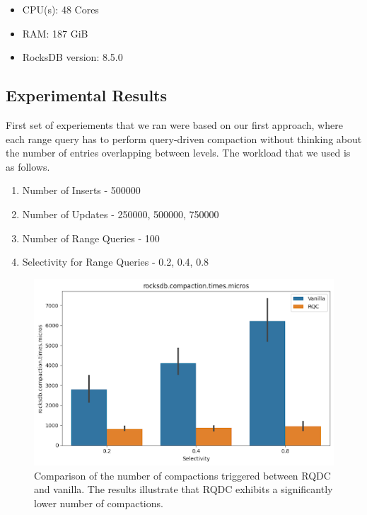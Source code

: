 \begin{itemize}
    \item CPU(s)\:: 48 Cores
    \item RAM\:: 187 GiB
    \item RocksDB version\:: 8.5.0
\end{itemize}

\subsection{Experimental Results}
First set of experiements that we ran were based on our first approach, where each range query has to 
perform query-driven compaction without thinking about the number of entries overlapping between levels. The workload that
we used is as follows.

\begin{enumerate}[leftmargin=*,labelindent=0mm, itemsep=0.2\baselineskip]
    \item Number of Inserts \-- 500000
    \item Number of Updates \-- 250000, 500000, 750000
    \item Number of Range Queries \-- 100 
    \item Selectivity for Range Queries \-- 0.2, 0.4, 0.8
\end{enumerate}

\begin{figure}
    \centering
    \includegraphics[scale=0.45]{Figures/Compaction Times.png}
    \caption{Comparison of the number of compactions triggered between RQDC and vanilla. 
    The results illustrate that RQDC exhibits a significantly lower number of compactions.}\label{fig:compaction_times}
\end{figure}

